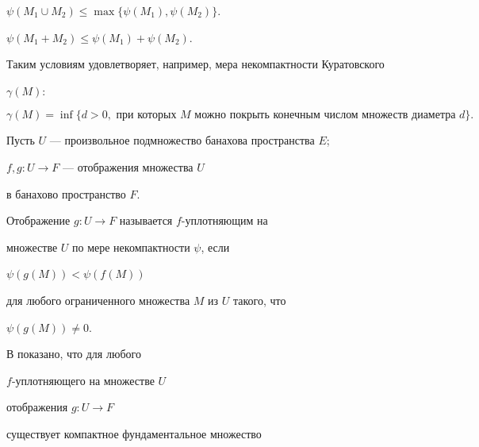 \begin{conds}


$\psi (M_1 \cup M_2) \leq \max \{\psi (M_1), \psi (M_2) \}$.


\end{conds} 





\begin{conds}


$\psi (M_1 + M_2) \leq \psi (M_1) + \psi (M_2)$.


\end{conds}





Таким условиям удовлетворяет, например, мера некомпактности Куратовского 


$\gamma (M)$:


$$


\gamma (M) = \inf \{d > 0,


\text{ при которых $M$ можно покрыть конечным числом множеств диаметра }


d\}.


$$





Пусть $U$ --- произвольное подмножество банахова пространства $E$;


$f,g : U \to F$ --- отображения множества $U$


в банахово пространство $F$.





\begin{defns}


Отображение $g : U \to F$ называется $f$-уплотняющим на


множестве $U$ по мере некомпактности $\psi$, если


$\psi (g (M)) < \psi (f(M))$


для любого ограниченного множества $M$ из $U$ такого, что 


$\psi (g(M)) \ne 0$.


\end{defns}





В \cite{9} показано, что для любого 


$f$-уплотняющего на множестве $U$


отображения $g : U \to F$


существует компактное фундаментальное множество 


